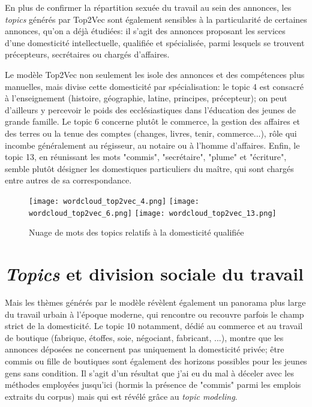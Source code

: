 En plus de confirmer la répartition sexuée du travail au sein des annonces, les\textit{ topics} générés par Top2Vec sont également sensibles à la particularité de certaines annonces, qu'on a déjà étudiées: il s'agit des annonces proposant les services d'une domesticité intellectuelle, qualifiée et spécialisée, parmi lesquels se trouvent précepteurs, secrétaires ou chargés d'affaires. 

Le modèle Top2Vec non seulement les isole des annonces et des compétences plus manuelles, mais divise cette domesticité par spécialisation: le topic 4 est consacré à l'enseignement (histoire, géographie, latine, principes, précepteur); on peut d'ailleurs y percevoir le poids des ecclésiastiques dans l'éducation des jeunes de grande famille. Le topic 6 concerne plutôt le commerce, la gestion des affaires et des terres ou la tenue des comptes (changes, livres, tenir, commerce...), rôle qui incombe généralement au régisseur, au notaire ou à l'homme d'affaires. Enfin, le topic 13, en réunissant les mots "commis", "secrétaire", "plume" et "écriture", semble plutôt désigner les domestiques particuliers du maître, qui sont chargés entre autres de sa correspondance. 

\begin{figure}[h!t]
	\centering
	\texttt{[image: wordcloud\_top2vec\_4.png]}
	\texttt{[image: wordcloud\_top2vec\_6.png]}
	\texttt{[image: wordcloud\_top2vec\_13.png]}
	\caption{Nuage de mots des topics relatifs à la domesticité qualifiée}
\end{figure}

\section{\textit{Topics} et division sociale du travail}

Mais les thèmes générés par le modèle révèlent également un panorama plus large du travail urbain à l'époque moderne, qui rencontre ou recouvre parfois le champ strict de la domesticité. Le topic 10 notamment, dédié au commerce et au travail de boutique (fabrique, étoffes, soie, négociant, fabricant, ...), montre que les annonces déposées ne concernent pas uniquement la domesticité privée; être commis ou fille de boutiques sont également des horizons possibles pour les jeunes gens sans condition. Il s'agit d'un résultat que j'ai eu du mal à déceler avec les méthodes employées jusqu'ici (hormis la présence de "commis" parmi les emplois extraits du corpus) mais qui est révélé grâce au \textit{topic modeling}.

